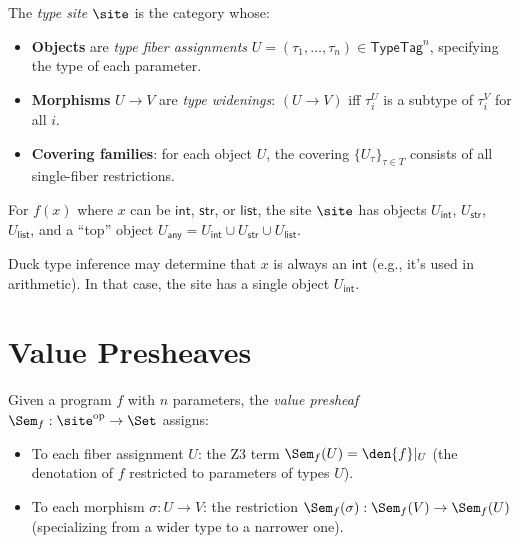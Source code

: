 \begin{definition}
\label{def:type-site}
The \emph{type site} $\site$ is the category whose:
\begin{itemize}
  \item \textbf{Objects} are \emph{type fiber assignments}
    $U = (\tau_1, \ldots, \tau_n) \in \mathsf{TypeTag}^n$, specifying
    the type of each parameter.
  \item \textbf{Morphisms} $U \to V$ are \emph{type widenings}:
    $(U \to V)$ iff $\tau_i^U$ is a subtype of $\tau_i^V$ for all $i$.
  \item \textbf{Covering families}: for each object $U$, the covering
    $\{U_\tau\}_{\tau \in T}$ consists of all single-fiber restrictions.
\end{itemize}
\end{definition}

\begin{example}
For $f(x)$ where $x$ can be $\mathsf{int}$, $\mathsf{str}$, or
$\mathsf{list}$, the site $\site$ has objects $U_\mathsf{int}$,
$U_\mathsf{str}$, $U_\mathsf{list}$, and a ``top'' object
$U_\mathsf{any} = U_\mathsf{int} \cup U_\mathsf{str} \cup
U_\mathsf{list}$.

Duck type inference may determine that $x$ is always an $\mathsf{int}$
(e.g., it's used in arithmetic).  In that case, the site has a single
object $U_\mathsf{int}$.
\end{example}

\section{Value Presheaves}

\begin{definition}
\label{def:value-presheaf}
Given a program $f$ with $n$ parameters, the \emph{value presheaf}
$\Sem_f : \site^{\mathrm{op}} \to \Set$ assigns:
\begin{itemize}
  \item To each fiber assignment $U$: the Z3 term
    $\Sem_f(U) = \den{f}|_U$ (the denotation of $f$ restricted to
    parameters of types $U$).
  \item To each morphism $\sigma : U \to V$: the restriction
    $\Sem_f(\sigma) : \Sem_f(V) \to \Sem_f(U)$ (specializing from
    a wider type to a narrower one).
\end{itemize}
\end{definition}

